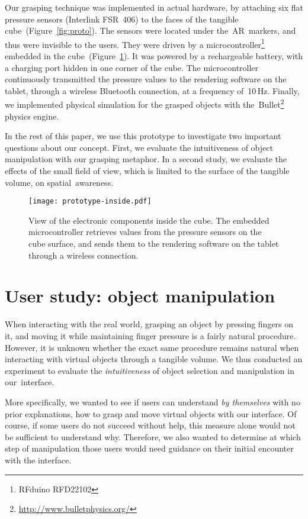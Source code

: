 \documentclass{vgtc}                         \havecopyrightspacefalse
\begin{document}
Our grasping technique was implemented in actual hardware, by attaching six flat pressure sensors (Interlink\textregistered{} FSR~406) to the faces of the tangible cube~(Figure~\ref{fig:proto}). The sensors were located under the~AR~markers, and thus were invisible to the users. They were driven by a microcontroller\footnote{\mbox{RFduino} RFD22102} embedded in the cube~(Figure~\ref{fig:proto-inside}). It was powered by a rechargeable battery, with a charging port hidden in one corner of the cube. The microcontroller continuously transmitted the pressure values to the rendering software on the tablet, through a wireless Bluetooth connection, at a frequency of~10\,Hz. Finally, we implemented physical simulation for the grasped objects with the~Bullet\footnote{\url{http://www.bulletphysics.org/}} physics engine.

In the rest of this paper, we use this prototype to investigate two important questions about our concept. First, we evaluate the intuitiveness of object manipulation with our grasping metaphor. In a second study, we evaluate the effects of the small field of view, which is limited to the surface of the tangible volume, on spatial~awareness.

\begin{figure}[t]
  \centering
  \texttt{[image: prototype-inside.pdf]}
  \caption{View of the electronic components inside the cube. The embedded microcontroller retrieves values from the pressure sensors on the cube surface, and sends them to the rendering software on the tablet through a wireless connection.}
  \label{fig:proto-inside}
\end{figure}

\section{User study: object manipulation}

When interacting with the real world, grasping an object by pressing fingers on it, and moving it while maintaining finger pressure is a fairly natural procedure. However, it is unknown whether the exact same procedure remains natural when interacting with virtual objects through a tangible volume. We thus conducted an experiment to evaluate the \emph{intuitiveness} of object selection and manipulation in our~interface.

More specifically, we wanted to see if users can understand \emph{by themselves} with no prior explanations, how to grasp and move virtual objects with our interface. Of course, if some users do not succeed without help, this measure alone would not be sufficient to understand why. Therefore, we also wanted to determine at which step of manipulation those users would need guidance on their initial encounter with the interface.
\end{document}
